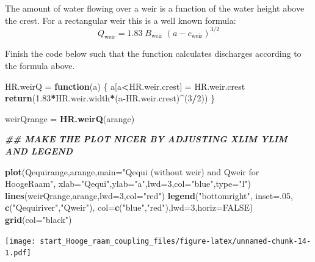 \documentclass[
]{article}
\newenvironment{Shaded}{\begin{snugshade}}{\end{snugshade}}
\newcommand{\AttributeTok}[1]{\textcolor[rgb]{0.13,0.29,0.53}{#1}}
\newcommand{\ConstantTok}[1]{\textcolor[rgb]{0.56,0.35,0.01}{#1}}
\newcommand{\ControlFlowTok}[1]{\textcolor[rgb]{0.13,0.29,0.53}{\textbf{#1}}}
\newcommand{\DecValTok}[1]{\textcolor[rgb]{0.00,0.00,0.81}{#1}}
\newcommand{\DocumentationTok}[1]{\textcolor[rgb]{0.56,0.35,0.01}{\textbf{\textit{#1}}}}
\newcommand{\FloatTok}[1]{\textcolor[rgb]{0.00,0.00,0.81}{#1}}
\newcommand{\FunctionTok}[1]{\textcolor[rgb]{0.13,0.29,0.53}{\textbf{#1}}}
\newcommand{\NormalTok}[1]{#1}
\newcommand{\OtherTok}[1]{\textcolor[rgb]{0.56,0.35,0.01}{#1}}
\newcommand{\SpecialCharTok}[1]{\textcolor[rgb]{0.81,0.36,0.00}{\textbf{#1}}}
\newcommand{\StringTok}[1]{\textcolor[rgb]{0.31,0.60,0.02}{#1}}
\begin{document}
The amount of water flowing over a weir is a function of the water
height above the crest. For a rectangular weir this is a well known
formula:
\[Q_\mathrm{weir} = 1.83\; B_\mathrm{weir}\; (a-c_\mathrm{weir})^{3/2}\]

Finish the code below such that the function calculates discharges
according to the formula above.

\begin{Shaded}
\begin{Highlighting}[]
\NormalTok{HR.weirQ }\OtherTok{=} \ControlFlowTok{function}\NormalTok{(a)}
\NormalTok{\{}
\NormalTok{  a[a}\SpecialCharTok{\textless{}}\NormalTok{HR.weir.crest] }\OtherTok{=}\NormalTok{ HR.weir.crest}
  \FunctionTok{return}\NormalTok{(}\FloatTok{1.83}\SpecialCharTok{*}\NormalTok{HR.weir.width}\SpecialCharTok{*}\NormalTok{(a}\SpecialCharTok{{-}}\NormalTok{HR.weir.crest)}\SpecialCharTok{\^{}}\NormalTok{(}\DecValTok{3}\SpecialCharTok{/}\DecValTok{2}\NormalTok{))}
\NormalTok{\}}

\NormalTok{weirQrange }\OtherTok{=} \FunctionTok{HR.weirQ}\NormalTok{(arange)}

\DocumentationTok{\#\# MAKE THE PLOT NICER BY ADJUSTING XLIM YLIM AND LEGEND}

\FunctionTok{plot}\NormalTok{(Qequirange,arange,}\AttributeTok{main=}\StringTok{"Qequi (without weir) and Qweir for HoogeRaam"}\NormalTok{,}
     \AttributeTok{xlab=}\StringTok{"Qequi"}\NormalTok{,}\AttributeTok{ylab=}\StringTok{"a"}\NormalTok{,}\AttributeTok{lwd=}\DecValTok{3}\NormalTok{,}\AttributeTok{col=}\StringTok{"blue"}\NormalTok{,}\AttributeTok{type=}\StringTok{"l"}\NormalTok{)}
\FunctionTok{lines}\NormalTok{(weirQrange,arange,}\AttributeTok{lwd=}\DecValTok{3}\NormalTok{,}\AttributeTok{col=}\StringTok{"red"}\NormalTok{)}
\FunctionTok{legend}\NormalTok{(}\StringTok{"bottomright"}\NormalTok{, }\AttributeTok{inset=}\NormalTok{.}\DecValTok{05}\NormalTok{,}
       \FunctionTok{c}\NormalTok{(}\StringTok{"Qequiriver"}\NormalTok{,}\StringTok{"Qweir"}\NormalTok{), }\AttributeTok{col=}\FunctionTok{c}\NormalTok{(}\StringTok{"blue"}\NormalTok{,}\StringTok{"red"}\NormalTok{),}\AttributeTok{lwd=}\DecValTok{3}\NormalTok{,}\AttributeTok{horiz=}\ConstantTok{FALSE}\NormalTok{)}
\FunctionTok{grid}\NormalTok{(}\AttributeTok{col=}\StringTok{"black"}\NormalTok{)}
\end{Highlighting}
\end{Shaded}

\texttt{[image: start\_Hooge\_raam\_coupling\_files/figure-latex/unnamed-chunk-14-1.pdf]}
\end{document}
